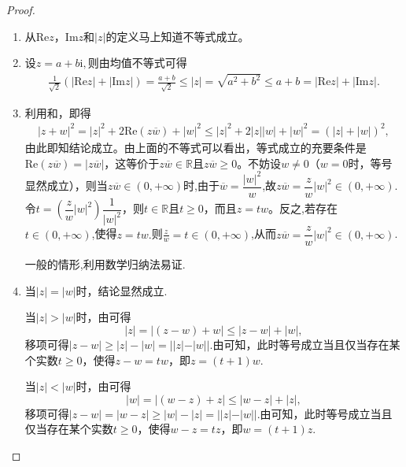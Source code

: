 \documentclass[../../main.tex]{subfiles}%
\begin{document}
\begin{proof}
\begin{enumerate}[(1)]
\item 从\(\mathrm{Re}z\)，\(\mathrm{Im}z\)和\(|z|\)的定义马上知道不等式成立。

\item 设$z=a+b\mathrm{i},$则由均值不等式可得
\begin{align*}
\frac{1}{\sqrt{2}}\left( \left| \mathrm{Re}z \right|+\left| \mathrm{Im}z \right| \right) =\frac{a+b}{\sqrt{2}}\leqslant \left| z \right|=\sqrt{a^2+b^2}\leqslant a+b=\left| \mathrm{Re}z \right|+\left| \mathrm{Im}z \right|.
\end{align*}

\item 利用和，即得
\begin{align*}
|z + w|^2  = |z|^2 + 2\mathrm{Re}(z\overline{w}) + |w|^2\leqslant |z|^2 + 2|z||w| + |w|^2 = (|z| + |w|)^2,
\end{align*}
由此即知结论成立。由上面的不等式可以看出，等式成立的充要条件是\(\mathrm{Re}(z\overline{w}) = |z\overline{w}|\)，这等价于$z\overline{w}\in \mathbb{R}$且\(z\overline{w} \geqslant 0\)。不妨设\(w \neq 0\)（\(w = 0\)时，等号显然成立），则当$z\overline{w}\in (0,+\infty)$时,由于\(\overline{w} = \dfrac{|w|^2}{w}\),故\(z\overline{w}=\dfrac{z}{w}|w|^2 \in(0,+\infty)\).令\(t = \left( \dfrac{z}{w}|w|^2 \right) \dfrac{1}{|w|^2}\)，则$t\in \mathbb{R}$且\(t \geqslant 0\)，而且\(z = tw\)。反之,若存在$t\in (0,+\infty)$,使得$z=tw.$则$\frac{z}{w}=t\in (0,+\infty)$,从而\(z\overline{w}=\dfrac{z}{w}|w|^2 \in(0,+\infty)\).

一般的情形,利用数学归纳法易证.

\item 当\(| z | = | w |\)时，结论显然成立.

当\(| z | > | w |\)时，由可得
\[| z | = | (z - w) + w | \leqslant | z - w | + | w |,\]
移项可得\(| z - w | \geqslant | z | - | w | = | | z | - | w | |\).由可知，此时等号成立当且仅当存在某个实数\(t \geqslant 0\)，使得\(z - w = tw\)，即\(z = (t + 1)w\).

当\(| z | < | w |\)时，由可得
\[| w | = | (w - z) + z | \leqslant | w - z | + | z |,\]
移项可得\(| z - w | = | w - z | \geqslant | w | - | z | = | | z | - | w | |\).由可知，此时等号成立当且仅当存在某个实数\(t \geqslant 0\)，使得\(w - z = tz\)，即\(w = (t + 1)z\).
\end{enumerate}

\end{proof}
\end{document}
